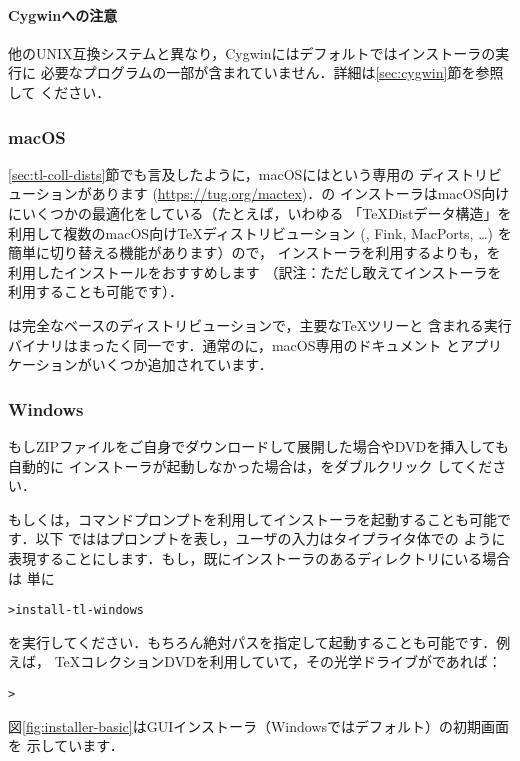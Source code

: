 \documentclass[uplatex,dvipdfmx,tombow]{jsarticle}
\begin{document}
\paragraph{Cygwinへの注意}
他のUNIX互換システムと異なり，Cygwinにはデフォルトでは\TL インストーラの実行に
必要なプログラムの一部が含まれていません．詳細は\ref{sec:cygwin}節を参照して
ください．

\subsubsection{macOS}
\label{sec:macos}

\ref{sec:tl-coll-dists}節でも言及したように，macOSには\MacTeX という専用の
ディストリビューションがあります (\url{https://tug.org/mactex})．\MacTeX の
インストーラはmacOS向けにいくつかの最適化をしている（たとえば，いわゆる
「{\TeX}Distデータ構造」を利用して複数のmacOS向け\TeX ディストリビューション
(\MacTeX, Fink, MacPorts, \ldots) を簡単に切り替える機能があります）ので，\TL
インストーラを利用するよりも，\MacTeX を利用したインストールをおすすめします
（訳注：ただし敢えて\TL インストーラを利用することも可能です）．

\MacTeX は完全な\TL ベースのディストリビューションで，主要な\TeX ツリーと
含まれる実行バイナリはまったく同一です．通常の\TL に，macOS専用のドキュメント
とアプリケーションがいくつか追加されています．

\subsubsection{Windows}\label{sec:wininst}

もしZIPファイルをご自身でダウンロードして展開した場合やDVDを挿入しても自動的に
インストーラが起動しなかった場合は，をダブルクリック
してください．

もしくは，コマンドプロンプトを利用してインストーラを起動することも可能です．以下
では\code{>}はプロンプトを表し，ユーザの入力はタイプライタ体での
ように表現することにします．もし，既にインストーラのあるディレクトリにいる場合は
単に
%
\begin{alltt}
> install-tl-windows
\end{alltt}
%
を実行してください．もちろん絶対パスを指定して起動することも可能です．例えば，
\TeX コレクションDVDを利用していて，その光学ドライブがであれば：
%
\begin{alltt}
> 
\end{alltt}
%
図\ref{fig:installer-basic}はGUIインストーラ（Windowsではデフォルト）の初期画面を
示しています．
\end{document}
